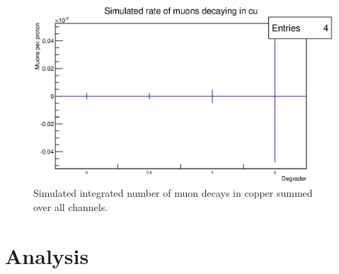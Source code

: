 \begin{figure}[hptb]
  \centering
    \includegraphics[width=.9\textwidth]{images/momentum_spectrum/sim_muon_rate_in_cu.eps}
  \caption{Simulated integrated number of muon decays in copper summed over all channels.}
  \label{fig:images_momentum_spectrum_sim_muon_rate_in_cu}
\end{figure}


\label{sec:results}
\section{Analysis} %
\label{sec:analysis}



